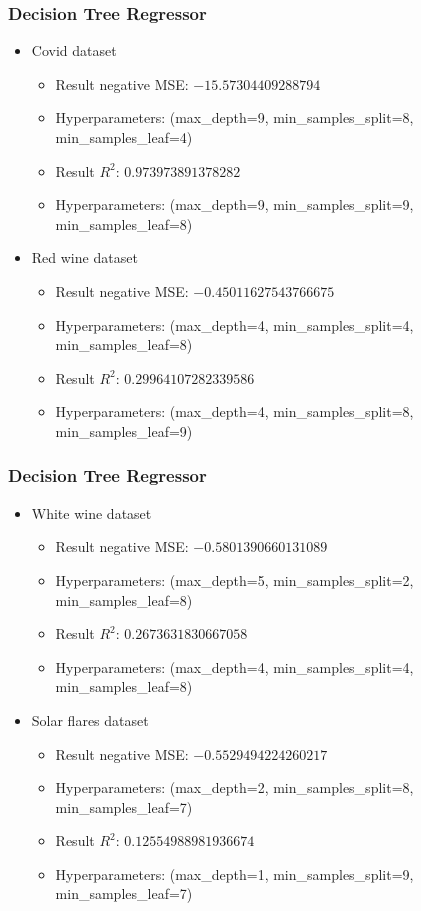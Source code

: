 \documentclass{beamer}
\begin{document}
\frame
{
  \frametitle{Decision Tree Regressor}

  \begin{itemize}
    \item Covid dataset
    \begin{itemize}
      \item Result negative MSE: $-15.57304409288794$
      \item Hyperparameters: (max\_depth=9, min\_samples\_split=8, min\_samples\_leaf=4)
      \item Result $R^{2}$: $0.973973891378282$
      \item Hyperparameters: (max\_depth=9, min\_samples\_split=9, min\_samples\_leaf=8)
    \end{itemize}
    \item Red wine dataset
    \begin{itemize}
      \item Result negative MSE: $-0.45011627543766675$
      \item Hyperparameters: (max\_depth=4, min\_samples\_split=4, min\_samples\_leaf=8)
      \item Result $R^{2}$: $0.29964107282339586$
      \item Hyperparameters: (max\_depth=4, min\_samples\_split=8, min\_samples\_leaf=9)
    \end{itemize}
  \end{itemize}
}

\frame
{
  \frametitle{Decision Tree Regressor}

  \begin{itemize}
    \item White wine dataset
    \begin{itemize}
      \item Result negative MSE: $-0.5801390660131089$
      \item Hyperparameters: (max\_depth=5, min\_samples\_split=2, min\_samples\_leaf=8)
      \item Result $R^{2}$: $0.2673631830667058$
      \item Hyperparameters: (max\_depth=4, min\_samples\_split=4, min\_samples\_leaf=8)
    \end{itemize}
    \item Solar flares dataset
    \begin{itemize}
      \item Result negative MSE: $-0.5529494224260217$
      \item Hyperparameters: (max\_depth=2, min\_samples\_split=8, min\_samples\_leaf=7)
      \item Result $R^{2}$: $0.12554988981936674$
      \item Hyperparameters: (max\_depth=1, min\_samples\_split=9, min\_samples\_leaf=7)
    \end{itemize}
  \end{itemize}
}
\end{document}
